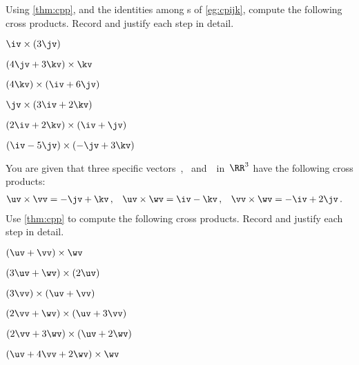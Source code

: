 \begin{exercise}  
Using \cref{thm:cpp}, and the identities among s of \cref{eg:cpijk}, compute the following cross products.
Record and justify each step in detail.
\begin{Parts}
\item \(\iv\times(3\jv)\)
\answer{\(3\kv\)}
\item \((4\jv+3\kv)\times\kv\)
\answer{\(4\iv\)}
\begin{reduce}
\item \((4\kv)\times(\iv+6\jv)\)
\answer{\(-24\iv +4\jv\)}
\item \(\jv\times(3\iv+2\kv)\)
\answer{\(2\iv-3\kv\)}
\end{reduce}
\item \((2\iv+2\kv)\times(\iv+\jv)\)
\answer{\(-2\iv +2\jv +2\kv\)}
\item \((\iv-5\jv)\times(-\jv+3\kv)\)
\answer{\(-15\iv-3\jv-\kv\)}
\end{Parts}
\end{exercise}




\begin{exercise}  
You are given that three specific vectors~\uv, \vv\ and~\wv\ in~\(\RR^3\) have the following cross products:
\begin{align*}
&\uv\times\vv=-\jv+\kv\,,
&&\uv\times\wv=\iv-\kv\,,
&&\vv\times\wv=-\iv+2\jv\,.
\end{align*}
Use \cref{thm:cpp} to compute the following cross products.
Record and justify each step in detail.

\begin{Parts}
\item \((\uv+\vv)\times\wv\)
\answer{\(2\jv -\kv\)}
\item \((3\uv+\wv)\times(2\uv)\)
\answer{\(-2\iv+2\kv\)}
\begin{reduce}
\item \((3\vv)\times(\uv+\vv)\)
\answer{\(3\jv -3\kv\)}
\item \((2\vv+\wv)\times(\uv+3\vv)\)
\answer{\(2\iv -4\jv -\kv\)}
\end{reduce}
\item \((2\vv+3\wv)\times(\uv+2\wv)\)
\answer{\(-7\iv +10\jv +\kv\)}
\item \((\uv+4\vv+2\wv)\times\wv\)
\answer{\(-3\iv +8\jv -\kv\)}
\end{Parts}
\end{exercise}







